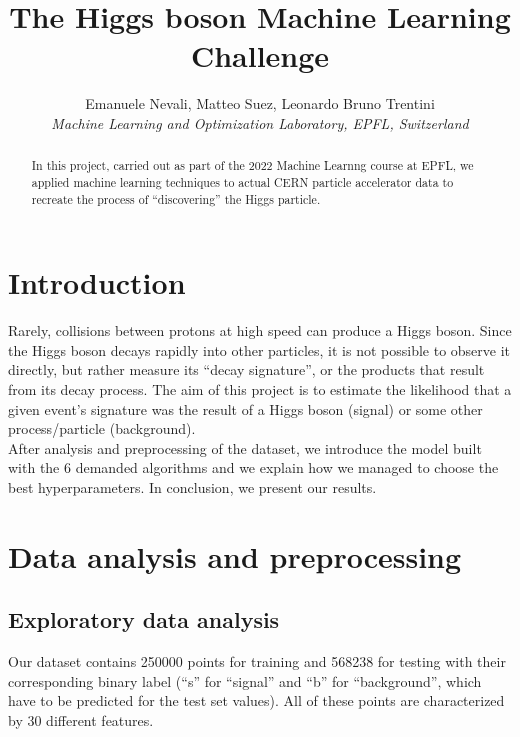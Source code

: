 \documentclass[10pt,conference,compsocconf]{IEEEtran}
\begin{document}
\title{The Higgs boson Machine Learning Challenge}

\author{
  Emanuele Nevali, Matteo Suez, Leonardo Bruno Trentini\\
  \textit{Machine Learning and Optimization Laboratory, EPFL, Switzerland}
}

\maketitle

\begin{abstract}
In this project, carried out as part of the 2022 Machine Learnng course at EPFL, we applied machine learning techniques to actual CERN particle accelerator data to recreate the process of
“discovering” the Higgs particle.\\
\end{abstract}

\section{Introduction}
Rarely, collisions between protons at high speed can produce a Higgs boson. Since the Higgs boson decays rapidly into other particles, it is not possible to observe it directly, but rather measure its “decay signature”, or the products that result from its decay process. The aim of this project is to estimate the likelihood that a given event’s signature was the result of a Higgs boson (signal) or some other process/particle (background).\\
After analysis and preprocessing of the dataset, we introduce the model built with the 6 demanded algorithms and we explain how we managed to choose the best hyperparameters. In conclusion, we present our results.

\section{Data analysis and preprocessing}

\subsection{Exploratory data analysis}
Our dataset contains 250000 points for training and 568238
for testing with their corresponding binary label (“s” for “signal” and “b” for “background”, which have to be predicted for the test set values). All of these points are characterized by 30 different features. \\
\vspace{-0.7cm}\\
\end{document}
